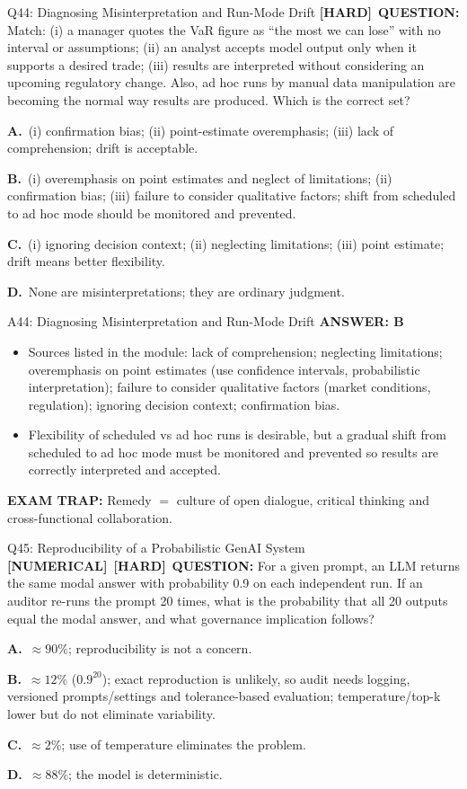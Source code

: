\documentclass[8pt]{beamer}
\newcommand{\fs}{\fontsize{10}{12}\selectfont}
\newcommand{\opts}[4]{\par\vspace{0.12cm}\noindent\textbf{A.}~#1\par\vspace{0.08cm}\noindent\textbf{B.}~#2\par\vspace{0.08cm}\noindent\textbf{C.}~#3\par\vspace{0.08cm}\noindent\textbf{D.}~#4\par}
\newcommand{\ans}[1]{\textcolor{myblue}{\textbf{ANSWER: #1}}}
\newcommand{\trap}[1]{\textcolor{myred}{\textbf{EXAM TRAP:}} #1}
\newcommand{\numtag}{\textcolor{mypurple}{\textbf{[NUMERICAL]}}}
\newcommand{\hard}{\textcolor{myorange}{\textbf{[HARD]}}}
\begin{document}
\begin{frame}[t]{Q44: Diagnosing Misinterpretation and Run-Mode Drift}
\fs
\hard\ \textbf{QUESTION:} Match: (i) a manager quotes the VaR figure as ``the most we can lose'' with no interval or assumptions; (ii) an analyst accepts model output only when it supports a desired trade; (iii) results are interpreted without considering an upcoming regulatory change. Also, ad hoc runs by manual data manipulation are becoming the normal way results are produced. Which is the correct set?
\opts{(i) confirmation bias; (ii) point-estimate overemphasis; (iii) lack of comprehension; drift is acceptable.}
{(i) overemphasis on point estimates and neglect of limitations; (ii) confirmation bias; (iii) failure to consider qualitative factors; shift from scheduled to ad hoc mode should be monitored and prevented.}
{(i) ignoring decision context; (ii) neglecting limitations; (iii) point estimate; drift means better flexibility.}
{None are misinterpretations; they are ordinary judgment.}
\end{frame}

\begin{frame}[t]{A44: Diagnosing Misinterpretation and Run-Mode Drift}
\fs
\ans{B}
\begin{itemize}
\item Sources listed in the module: lack of comprehension; neglecting limitations; overemphasis on point estimates (use confidence intervals, probabilistic interpretation); failure to consider qualitative factors (market conditions, regulation); ignoring decision context; confirmation bias.
\item Flexibility of scheduled vs ad hoc runs is desirable, but a gradual shift from scheduled to ad hoc mode must be monitored and prevented so results are correctly interpreted and accepted.
\end{itemize}
\trap{Remedy $=$ culture of open dialogue, critical thinking and \textcolor{myblue}{cross-functional collaboration}.}
\end{frame}


\begin{frame}[t]{Q45: Reproducibility of a Probabilistic GenAI System}
\fs
\numtag\ \hard\ \textbf{QUESTION:} For a given prompt, an LLM returns the same modal answer with probability 0.9 on each independent run. If an auditor re-runs the prompt 20 times, what is the probability that all 20 outputs equal the modal answer, and what governance implication follows?
\opts{$\approx90\%$; reproducibility is not a concern.}
{$\approx12\%$ ($0.9^{20}$); exact reproduction is unlikely, so audit needs logging, versioned prompts/settings and tolerance-based evaluation; temperature/top-k lower but do not eliminate variability.}
{$\approx2\%$; use of temperature eliminates the problem.}
{$\approx88\%$; the model is deterministic.}
\end{frame}
\end{document}
